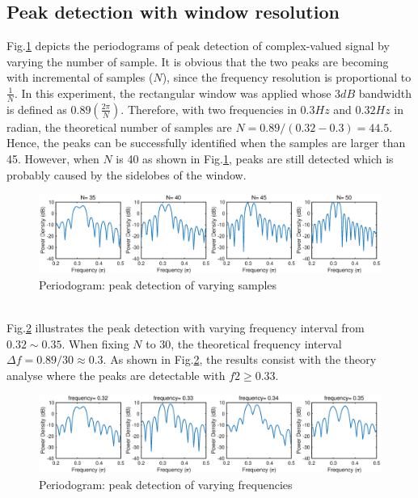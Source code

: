 \subsection{Peak detection with window resolution}
Fig.\ref{fig:1_3_d1} depicts the periodograms of peak detection of complex-valued signal by varying the number of sample. It is obvious that the two peaks are becoming with incremental of samples ($N$), since the frequency resolution is proportional to $\frac{1}{N}$. In this experiment, the rectangular window was applied whose 3$dB$ bandwidth is defined as $0.89(\frac{2\pi}{N})$. Therefore, with two frequencies in $0.3Hz$ and $0.32Hz$ in radian, the theoretical number of samples are $N =0.89/(0.32-0.3)=44.5$. Hence, the peaks can be successfully identified when the samples are larger than 45. However, when $N$ is 40 as shown in Fig.\ref{fig:1_3_d1}, peaks are still detected which is probably caused by the sidelobes of the window.
\begin{figure}[htbp]
    \centering
    \includegraphics[width=1\textwidth]{fig/13/13d1.eps}
    \caption{Periodogram: peak detection of varying samples}
    \label{fig:1_3_d1}
\end{figure}\\
Fig.\ref{fig:1_3_d2} illustrates the peak detection with varying frequency interval from $0.32\sim0.35$. When fixing $N$ to 30, the theoretical frequency interval $\Delta f= 0.89/30 \approx 0.3$. As shown in Fig.\ref{fig:1_3_d2}, the results consist with the theory analyse where the peaks are detectable with $f2 \ge 0.33$.\\
\begin{figure}[htbp]
    \centering
    \includegraphics[width=1\textwidth]{fig/13/13d2.eps}
    \caption{Periodogram: peak detection of varying frequencies}
    \label{fig:1_3_d2}
\end{figure}
